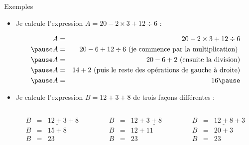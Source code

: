 \documentclass[xcolor={dvipsnames}]{beamer}
\newcommand{\myitem}{\item[\textbullet]}
\begin{document}
\begin{frame}
	\begin{exampleblock}{Exemples}
		\begin{itemize}
			\myitem Je calcule l'expression $A= 20 - 2 \times 3 + 12 \div 6$ :\pause
			
			\vspace*{-0.5cm}
			
			\begin{eqnarray*}
				A &=& 20 - 2 \times 3 + 12 \div 6 \\ \pause
				A &=& 20 - 6 + 12 \div 6 \text{ (je commence par la multiplication) }\\ \pause
				A &=& 20 - 6 + 2 \text{ (ensuite la division)} \\ \pause
				A &=& 14 + 2 \text{ (puis le reste des opérations de gauche à droite)}\\ \pause
				A &=& 16 \pause
			\end{eqnarray*}
			
			\myitem Je calcule l'expression $B= 12 + 3 +8$ de trois façons différentes : \pause
			
			\vspace*{-0.5cm}
			\begin{columns}
				\begin{column}{0.33\textwidth}
					\begin{eqnarray*}
						B &=& \underline{12 + 3} + 8 \\
						B &=& 15 + 8 \\
						B &=& 23
					\end{eqnarray*}
				\end{column}\pause
				
				\begin{column}{0.33\textwidth}
					\begin{eqnarray*}
						B &=& 12 + \underline{3 + 8} \\
						B &=& 12 + 11 \\
						B &=& 23
					\end{eqnarray*}
				\end{column}\pause
				
				
				\begin{column}{0.33\textwidth}
					\begin{eqnarray*}
						B &=& \underline{12 + 8} + 3 \\
						B &=& 20 + 3 \\
						B &=& 23
					\end{eqnarray*}	
				\end{column}
				
			\end{columns}
			
		\end{itemize}
	\end{exampleblock}
\end{frame}
\end{document}
